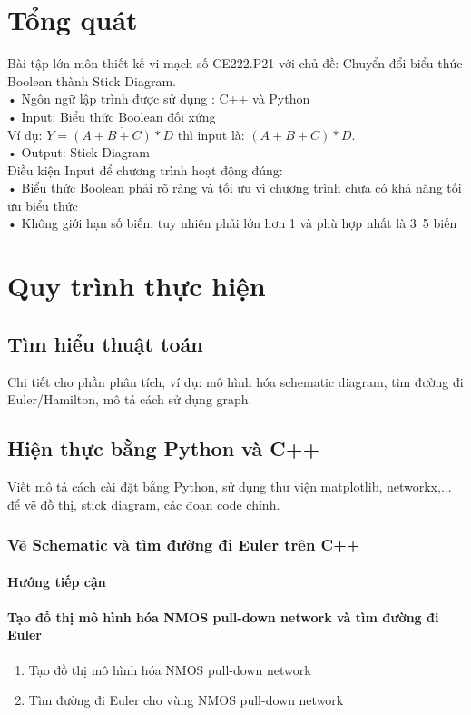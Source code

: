\documentclass[a4paper,12pt]{article}
\begin{document}
\section{Tổng quát}
Bài tập lớn môn thiết kế vi mạch số CE222.P21 với chủ đề: Chuyển đổi biểu thức Boolean thành Stick Diagram.\\
• Ngôn ngữ lập trình được sử dụng : C++ và Python\\
• Input: Biểu thức Boolean đối xứng\\
\hspace{4cm}Ví dụ: \( Y = \overline{(A + B + C) * D} \) thì input là: \( (A + B + C) * D \).\\
• Output: Stick Diagram\\
\hspace{4cm}Điều kiện Input để chương trình hoạt động đúng:\\
• Biểu thức Boolean phải rõ ràng và tối ưu vì chương trình chưa có khả năng tối ưu biểu thức\\
• Không giới hạn số biến, tuy nhiên phải lớn hơn 1 và phù hợp nhất là 3~5 biến\\
\newpage
\section{Quy trình thực hiện}

\subsection{Tìm hiểu thuật toán}
Chi tiết cho phần phân tích, ví dụ: mô hình hóa schematic diagram, tìm đường đi Euler/Hamilton, mô tả cách sử dụng graph.
\subsection{Hiện thực bằng Python và C++}
Viết mô tả cách cài đặt bằng Python, sử dụng thư viện matplotlib, networkx,... để vẽ đồ thị, stick diagram, các đoạn code chính.
\subsubsection{Vẽ Schematic và tìm đường đi Euler trên C++}
\paragraph{Hướng tiếp cận}
\paragraph{Tạo đồ thị mô hình hóa NMOS pull-down network và tìm đường đi Euler}
\begin{enumerate}[label=\alph*.]
    \item{Tạo đồ thị mô hình hóa NMOS pull-down network}
    \item{Tìm đường đi Euler cho vùng NMOS pull-down network}
\end{enumerate}
\end{document}
